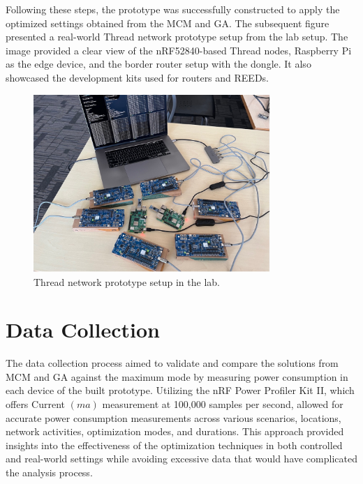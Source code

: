 Following these steps, the prototype was successfully constructed to apply the optimized settings obtained from the MCM and GA. The subsequent figure presented a real-world Thread network prototype setup from the lab setup. The image provided a clear view of the nRF52840-based Thread nodes, Raspberry Pi as the edge device, and the border router setup with the dongle. It also showcased the development kits used for routers and REEDs.

\begin{figure}[H]
    \centering
    \includegraphics[width=0.8\textwidth]{images/research_design/prototype_setup.jpg}
    \caption{Thread network prototype setup in the lab.}
    \label{fig:prototype_setup}
\end{figure}

\section{Data Collection}

The data collection process aimed to validate and compare the solutions from MCM and GA against the maximum mode by measuring power consumption in each device of the built prototype. Utilizing the nRF Power Profiler Kit II, which offers Current $\left(ma\right)$ measurement at 100,000 samples per second, allowed for accurate power consumption measurements across various scenarios, locations, network activities, optimization modes, and durations. This approach provided insights into the effectiveness of the optimization techniques in both controlled and real-world settings while avoiding excessive data that would have complicated the analysis process.

